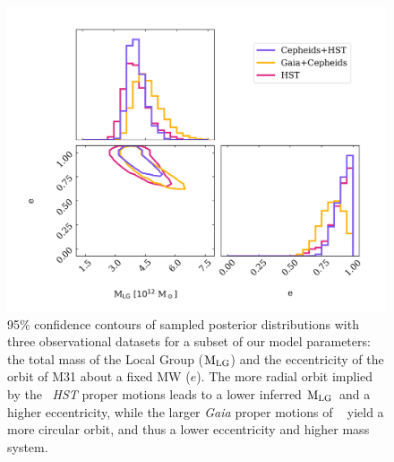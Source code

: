 \documentclass[twocolumn]{aastex631}
\newcommand{\mlg}{\ensuremath{\textrm{M}_{\rm LG}}}
\begin{document}
\begin{figure}[htb]
  \centering
  \includegraphics[width=\columnwidth,trim=1.3cm 0.8cm 1.3cm 1.3cm,clip=true]
  {analyze-runs-contour.png}
  \caption{\label{fig:contour} 95\% confidence contours of sampled posterior 
  distributions with three observational datasets for a subset of our model 
  parameters: the total mass of the Local Group (\mlg)
  and the eccentricity of the orbit of M31 about a fixed MW ($e$). 
  The more radial orbit implied by the~\cite{vdm2012} \textit{HST} proper 
  motions leads to a lower inferred \mlg\ and a higher
  eccentricity, while the larger \textit{Gaia} proper motions of
  ~\cite{Salomon2021} yield a more circular orbit, and thus a lower eccentricity
   and higher mass system. 
  }
\end{figure}
\end{document}
